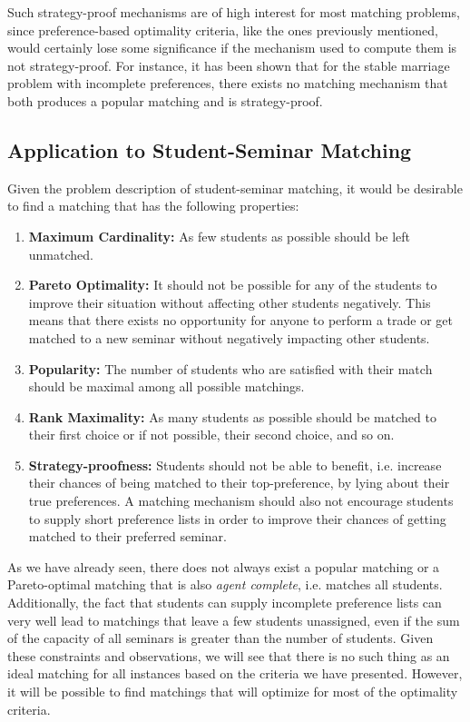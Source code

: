 Such strategy-proof mechanisms are of high interest for most matching problems, since preference-based optimality criteria, like the ones previously mentioned, would certainly lose some significance if the mechanism used to compute them is not strategy-proof. For instance, it has been shown \cite{ROTH1982127} that for the stable marriage problem with incomplete preferences, there exists no matching mechanism that both produces a popular matching and is strategy-proof.

\subsection{Application to Student-Seminar Matching}\label{criteria-application}
Given the problem description of student-seminar matching, it would be desirable to find a matching that has the following properties:
\begin{enumerate}
    \item \textbf{Maximum Cardinality:} As few students as possible should be left unmatched.
    \item \textbf{Pareto Optimality:} It should not be possible for any of the students to improve their situation without affecting other students negatively. This means that there exists no opportunity for anyone to perform a trade or get matched to a new seminar without negatively impacting other students.
    \item \textbf{Popularity:} The number of students who are satisfied with their match should be maximal among all possible matchings.
    \item \textbf{Rank Maximality:} As many students as possible should be matched to their first choice or if not possible, their second choice, and so on.
    \item \textbf{Strategy-proofness:} Students should not be able to benefit, i.e. increase their chances of being matched to their top-preference, by lying about their true preferences. A matching mechanism should also not encourage students to supply short preference lists in order to improve their chances of getting matched to their preferred seminar.
\end{enumerate}
As we have already seen, there does not always exist a popular matching or a Pareto-optimal matching that is also \emph{agent complete}, i.e. matches all students. Additionally, the fact that students can supply incomplete preference lists can very well lead to matchings that leave a few students unassigned, even if the sum of the capacity of all seminars is greater than the number of students. Given these constraints and observations, we will see that there is no such thing as an ideal matching for all instances based on the criteria we have presented. However, it will be possible to find matchings that will optimize for most of the optimality criteria.